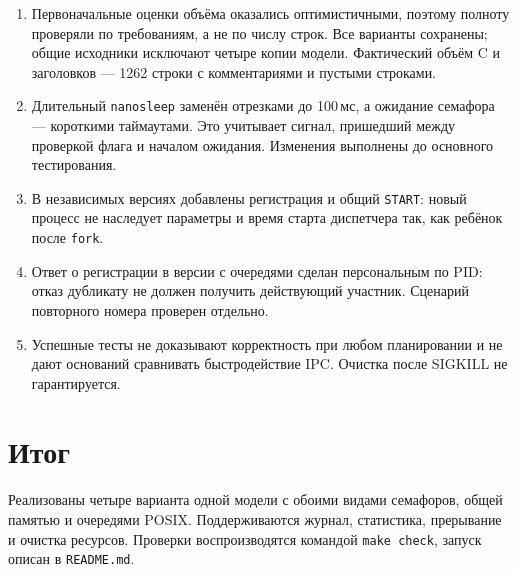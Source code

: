 \documentclass[12pt,a4paper]{article}
\begin{document}
\begin{enumerate}
\setlength{\itemsep}{0pt}
\setlength{\parsep}{0pt}
\setlength{\parskip}{0pt}
\item Первоначальные оценки объёма оказались оптимистичными, поэтому
полноту проверяли по требованиям, а не по числу строк. Все варианты
сохранены; общие исходники исключают четыре копии модели. Фактический
объём C и заголовков --- 1262 строки с комментариями и пустыми строками.
\item Длительный \verb|nanosleep| заменён отрезками до 100\,мс,
а ожидание семафора --- короткими таймаутами. Это учитывает сигнал,
пришедший между проверкой флага и началом ожидания. Изменения выполнены
до основного тестирования.
\item В независимых версиях добавлены регистрация и общий
\verb|START|: новый процесс не наследует параметры и время старта
диспетчера так, как ребёнок после \verb|fork|.
\item Ответ о регистрации в версии с очередями сделан персональным
по PID: отказ дубликату не должен получить действующий участник.
Сценарий повторного номера проверен отдельно.
\item Успешные тесты не доказывают корректность при любом планировании
и не дают оснований сравнивать быстродействие IPC. Очистка после
SIGKILL не гарантируется.
\end{enumerate}

\section{Итог}

Реализованы четыре варианта одной модели с обоими видами семафоров,
общей памятью и очередями POSIX. Поддерживаются журнал, статистика,
прерывание и очистка ресурсов. Проверки воспроизводятся командой
\verb|make check|, запуск описан в \verb|README.md|.
\end{document}
